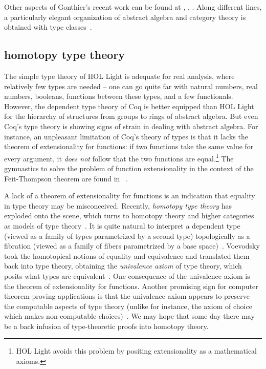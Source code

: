 \documentclass{llncs}
\begin{document}
Other aspects of Gonthier's recent work can be found at
\cite{gonPFSF}, \cite{gonPMS}, \cite{gonC}.
Along different lines, a particularly elegant organization of abstract
algebra and category theory is obtained with type
classes~\cite{SpE11}.

\subsection{homotopy type theory}

The simple type theory of HOL Light is adequate for real analysis,
where relatively few types are needed -- one can go quite far with
natural numbers, real numbers, booleans, functions between these
types, and a few functionals.  However, the dependent type theory of
Coq is better equipped than HOL Light for the hierarchy of structures
from groups to rings of abstract algebra.  But even
Coq's type theory is showing signs of strain in dealing with abstract
algebra.  For instance, an unpleasant limitation of Coq's theory of
types is that it lacks the theorem of extensionality for functions: if
two functions take the same value for every argument, it {\it does
  not} follow that the two functions are equal.\footnote{HOL Light
  avoids this problem by positing extensionality as a mathematical axioms.}  The
gymnastics to solve the problem of function extensionality in the
context of the Feit-Thompson theorem are found in ~\cite{gonMF}.

A lack of a theorem of extensionality for functions is an indication
that equality in type theory may be misconceived. Recently, {\it
  homotopy type theory} has exploded onto the scene, which turns to
homotopy theory and higher categories as models of type
theory~\cite{htt}.  It is quite natural to interpret a dependent type
(viewed as a family of types parametrized by a second type)
topologically as a fibration (viewed as a family of fibers
parametrized by a base space)~\cite{AW09}. Voevodsky took the
homotopical notions of equality and equivalence and translated them
back into type theory, obtaining the {\it univalence axiom} of type
theory, which posits what types are equivalent~\cite{VV11}.  One
consequence of the univalence axiom is the theorem of extensionality
for functions.  Another promising sign for computer theorem-proving
applications is that the univalence axiom appears to preserve the computable
aspects of type theory (unlike for instance, the axiom of choice which
makes non-computable choices)~\cite{LH11}.  We may hope that some day
there may be a back infusion of type-theoretic proofs into
homotopy theory.
\end{document}

